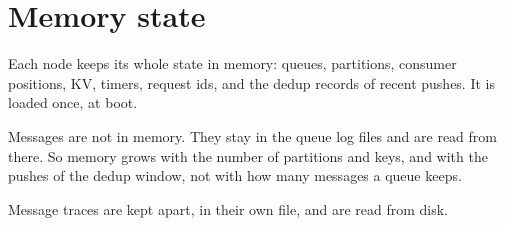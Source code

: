 
\section{Memory state}

Each node keeps its whole state in memory: queues, partitions, consumer positions, KV, timers,
request ids, and the dedup records of recent pushes. It is loaded once, at boot.

Messages are not in memory. They stay in the queue log files and are read from there. So memory
grows with the number of partitions and keys, and with the pushes of the dedup window, not with how
many messages a queue keeps.


Message traces are kept apart, in their own file, and are read from disk.

